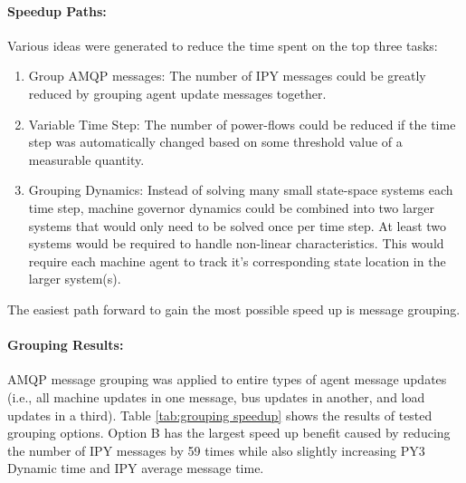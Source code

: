 \documentclass[12pt]{article}
\begin{document}
\paragraph{Speedup Paths:} Various ideas were generated to reduce the time spent on the top three tasks:
\begin{enumerate}
\item Group AMQP messages: The number of IPY messages could be greatly reduced by grouping agent update messages together.
\item Variable Time Step: The number of power-flows could be reduced if the time step was automatically changed based on some threshold value of a measurable quantity.
\item Grouping Dynamics: Instead of solving many small state-space systems each time step, machine governor dynamics could be combined into two larger systems that would only need to be solved once per time step. At least two systems would be required to handle non-linear characteristics. This would require each machine agent to track it's corresponding state location in the larger system(s).
\end{enumerate}
The easiest path forward to gain the most possible speed up is message grouping.


\pagebreak
\paragraph{Grouping Results:} AMQP message grouping was applied to entire types of agent message updates (i.e., all machine updates in one message, bus updates in another, and load updates in a third). Table \ref{tab:grouping speedup} shows the results of tested grouping options. Option B has the largest speed up benefit caused by reducing the number of IPY messages by 59 times while also slightly increasing PY3 Dynamic time and IPY average message time.
\end{document}
